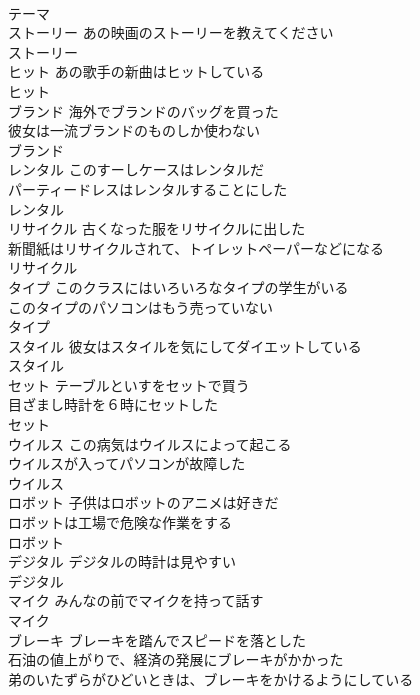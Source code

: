 \documentclass[8pt]{extreport}
\begin{document}
\begin{CJK}{UTF8}{min}
\\	テーマ			
\\	ストーリー	あの映画のストーリーを教えてください 
\\	ストーリー			
\\	ヒット	あの歌手の新曲はヒットしている 
\\	ヒット			
\\	ブランド	海外でブランドのバッグを買った 
\\	彼女は一流ブランドのものしか使わない 
\\	ブランド						
\\	レンタル	このすーしケースはレンタルだ 
\\	パーティードレスはレンタルすることにした 
\\	レンタル			
\\	リサイクル	古くなった服をリサイクルに出した 
\\	新聞紙はリサイクルされて、トイレットペーパーなどになる 
\\	リサイクル						
\\	タイプ	このクラスにはいろいろなタイプの学生がいる 
\\	このタイプのパソコンはもう売っていない 
\\	タイプ						
\\	スタイル	彼女はスタイルを気にしてダイエットしている 
\\	スタイル						
\\	セット	テーブルといすをセットで買う 
\\	目ざまし時計を６時にセットした 
\\	セット						
\\	ウイルス	この病気はウイルスによって起こる 
\\	ウイルスが入ってパソコンが故障した 
\\	ウイルス						
\\	ロボット	子供はロボットのアニメは好きだ 
\\	ロボットは工場で危険な作業をする 
\\	ロボット						
\\	デジタル	デジタルの時計は見やすい 
\\	デジタル						
\\	マイク	みんなの前でマイクを持って話す 
\\	マイク						
\\	ブレーキ	ブレーキを踏んでスピードを落とした 
\\	石油の値上がりで、経済の発展にブレーキがかかった 
\\	弟のいたずらがひどいときは、ブレーキをかけるようにしている 

\end{CJK}
\end{document}
